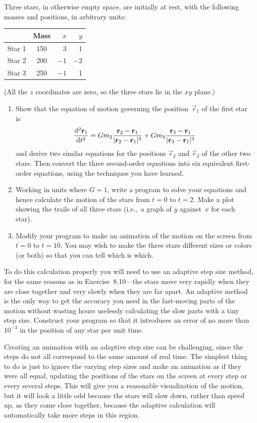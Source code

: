 \documentclass[12pt]{article}
\begin{document}
\begin{exercises}
  Three stars, in otherwise empty space, are initially at rest, with the
  following masses and positions, in arbitrary units:
\begin{center}
\begin{tabular}{l|crr}
       & Mass & $x$ & $y$ \\
\hline
Star 1 & 150 & 3 & 1 \\
Star 2 & 200 & $-1$ & $-2$ \\
Star 3 & 250 & $-1$ & 1
\end{tabular}
\end{center}
(All the $z$ coordinates are zero, so the three stars lie in the $xy$
plane.)
\begin{enumerate}\setlength{\itemsep}{0pt}
\item Show that the equation of motion governing the position~$\vec{r}_1$
  of the first star is
\begin{displaymath}
{\mathrm{d}^2\mathbf{r}_1\over\mathrm{d}t^2}
  = Gm_2{\mathbf{r}_2-\mathbf{r}_1\over|\mathbf{r}_2-\mathbf{r}_1|^3}
    + Gm_3{\mathbf{r}_3-\mathbf{r}_1\over|\mathbf{r}_3-\mathbf{r}_1|^3}
\end{displaymath}
and derive two similar equations for the positions $\vec{r}_2$ and
$\vec{r}_3$ of the other two stars.  Then convert the three second-order
equations into six equivalent first-order equations, using the techniques
you have learned.
\item Working in units where $G=1$, write a program to solve your equations
  and hence calculate the motion of the stars from $t=0$ to $t=2$.  Make a
  plot showing the trails of all three stars (i.e.,~a graph of $y$
  against~$x$ for each star).
\item Modify your program to make an animation of the motion on the screen
  from $t=0$ to $t=10$.  You may wish to make the three stars different
  sizes or colors (or both) so that you can tell which is which.
\end{enumerate}
To do this calculation properly you will need to use an adaptive step size
method, for the same reasons as in Exercise~8.10---the stars move very
rapidly when they are close together and very slowly when they are far
apart.  An adaptive method is the only way to get the accuracy you need in
the fast-moving parts of the motion without wasting hours uselessly
calculating the slow parts with a tiny step size.  Construct your program
so that it introduces an error of no more than $10^{-3}$ in the position of
any star per unit time.

Creating an animation with an adaptive step size can be challenging,
since the steps do not all correspond to the same amount of real time.  The
simplest thing to do is just to ignore the varying step sizes and make an
animation as if they were all equal, updating the positions of the stars on
the screen at every step or every several steps.  This will give you a
reasonable visualization of the motion, but it will look a little odd
because the stars will slow down, rather than speed up, as they come close
together, because the adaptive calculation will automatically take more
steps in this region.


\end{exercises}
\end{document}
